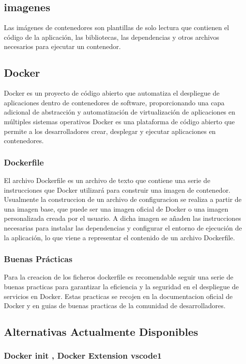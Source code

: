 \documentclass[12pt, a4paper, twoside]{article}
\begin{document}
\subsection{imagenes}
Las imágenes de contenedores son plantillas de solo lectura que contienen el código de la aplicación, las bibliotecas, las dependencias y otros archivos necesarios para ejecutar un contenedor.
\subsection{Docker}
Docker es un proyecto de código abierto que automatiza el despliegue de aplicaciones dentro de contenedores de software, proporcionando una capa adicional de abstracción y automatización de virtualización de aplicaciones en múltiples sistemas operativos
Docker es una plataforma de código abierto que permite a los desarrolladores crear, desplegar y ejecutar aplicaciones en contenedores. 
\subsubsection{Dockerfile}
El archivo Dockerfile es un archivo de texto que contiene una serie de instrucciones que Docker utilizará para construir una imagen de contenedor.
Usualmente la construccion de un archivo de configuracion se realiza a partir de una imagen base, que puede ser una imagen oficial de Docker o una imagen personalizada creada por el usuario.
A dicha imagen se añaden las instrucciones necesarias para instalar las dependencias y configurar el entorno de ejecución de la aplicación, lo que viene a representar el contenido de un archivo Dockerfile.
\subsubsection{Buenas Prácticas}
Para la creacion de los ficheros dockerfile es recomendable seguir una serie de buenas practicas para garantizar la eficiencia y la seguridad en el despliegue de servicios en Docker.
Estas practicas se recojen en la documentacion oficial de Docker y en guias de buenas practicas de la comunidad de desarrolladores.
\subsection{Alternativas Actualmente Disponibles}
\subsubsection{Docker init , Docker Extension vscode1}
\end{document}

